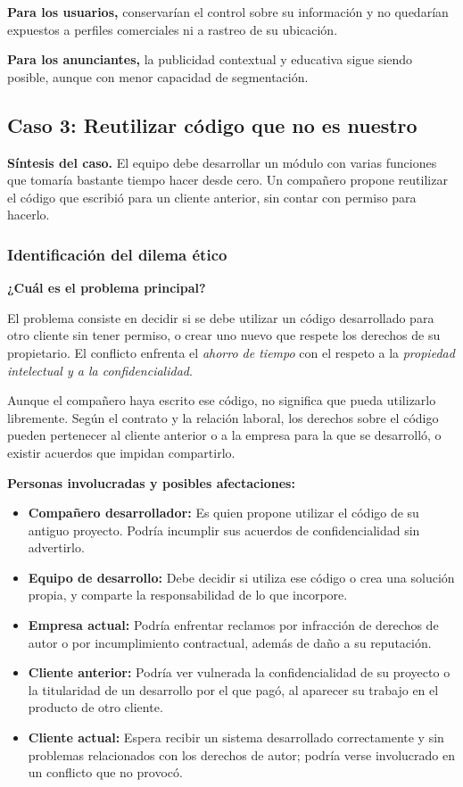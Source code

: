 \documentclass[12pt,a4paper,oneside]{article}
\newcommand{\rotulo}[1]{\par\Needspace{5\baselineskip}\noindent\textbf{#1}\par\nobreak}
\begin{document}
\textbf{Para los usuarios,} conservarían el control sobre su información y no quedarían expuestos a perfiles comerciales ni a rastreo de su ubicación.

\textbf{Para los anunciantes,} la publicidad contextual y educativa sigue siendo posible, aunque con menor capacidad de segmentación.


\subsection{Caso 3: Reutilizar código que no es nuestro}

\textbf{Síntesis del caso.} El equipo debe desarrollar un módulo con varias funciones que tomaría bastante tiempo hacer desde cero. Un compañero propone reutilizar el código que escribió para un cliente anterior, sin contar con permiso para hacerlo.

\subsubsection{Identificación del dilema ético}

\rotulo{¿Cuál es el problema principal?}

El problema consiste en decidir si se debe utilizar un código desarrollado para otro cliente sin tener permiso, o crear uno nuevo que respete los derechos de su propietario. El conflicto enfrenta el \emph{ahorro de tiempo} con el respeto a la \emph{propiedad intelectual y a la confidencialidad}.

Aunque el compañero haya escrito ese código, no significa que pueda utilizarlo libremente. Según el contrato y la relación laboral, los derechos sobre el código pueden pertenecer al cliente anterior o a la empresa para la que se desarrolló, o existir acuerdos que impidan compartirlo.

\rotulo{Personas involucradas y posibles afectaciones:}

\begin{itemize}[leftmargin=1.8em,itemsep=3pt]
    \item \textbf{Compañero desarrollador:} Es quien propone utilizar el código de su antiguo proyecto. Podría incumplir sus acuerdos de confidencialidad sin advertirlo.
    \item \textbf{Equipo de desarrollo:} Debe decidir si utiliza ese código o crea una solución propia, y comparte la responsabilidad de lo que incorpore.
    \item \textbf{Empresa actual:} Podría enfrentar reclamos por infracción de derechos de autor o por incumplimiento contractual, además de daño a su reputación.
    \item \textbf{Cliente anterior:} Podría ver vulnerada la confidencialidad de su proyecto o la titularidad de un desarrollo por el que pagó, al aparecer su trabajo en el producto de otro cliente.
    \item \textbf{Cliente actual:} Espera recibir un sistema desarrollado correctamente y sin problemas relacionados con los derechos de autor; podría verse involucrado en un conflicto que no provocó.
\end{itemize}
\end{document}
